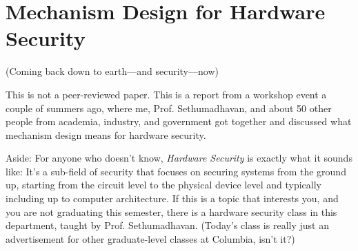 \documentclass[11pt]{article}
\begin{document}





\section{Mechanism Design for Hardware Security}

(Coming back down to earth---and security---now)

This is not a peer-reviewed paper. This is a report from a workshop event a couple of summers ago, where me, Prof. Sethumadhavan, and about 50 other people from academia, industry, and government got together and discussed what mechanism design means for hardware security. 

Aside: For anyone who doesn't know, {\it Hardware Security} is exactly what it sounds like: It's a sub-field of security that focuses on securing systems from the ground up, starting from the circuit level to the physical device level and typically including up to computer architecture. 
If this is a topic that interests you, and you are not graduating this semester, there is a hardware security class in this department, taught by Prof. Sethumadhavan. 
(Today's class is really just an advertisement for other graduate-level classes at Columbia, isn't it?)
\end{document}
